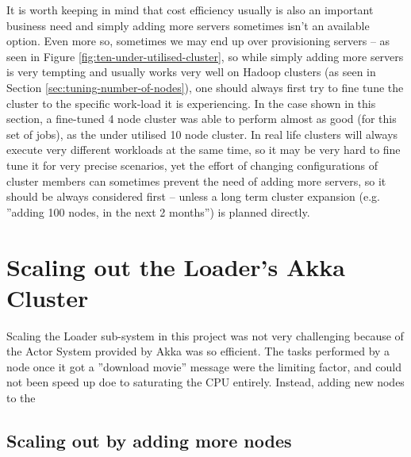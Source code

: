 It is worth keeping in mind that cost efficiency usually is also an important business need and simply adding more servers sometimes isn't an available option. Even more so, sometimes we may end up over provisioning servers -- as seen in Figure \ref{fig:ten-under-utilised-cluster}, so while simply adding more servers is very tempting and usually works very well on Hadoop clusters (as seen in Section \ref{sec:tuning-number-of-nodes}), one should always first try to fine tune the cluster to the specific work-load it is experiencing. In the case shown in this section, a fine-tuned 4 node cluster was able to perform almost as good (for this set of jobs), as the under utilised 10 node cluster. In real life clusters will always execute very different workloads at the same time, so it may be very hard to fine tune it for very precise scenarios, yet the effort of changing configurations of cluster members can sometimes prevent the need of adding more servers, so it should be always considered first -- unless a long term cluster expansion (e.g. ''adding 100 nodes, in the next 2 months'') is planned directly.

%



\section{Scaling out the Loader's Akka Cluster}
\label{sec:scaling-akka}

Scaling the Loader sub-system in this project was not very challenging because of the Actor System provided by Akka was so efficient. The tasks performed by a node once it got a ''download movie'' message were the limiting factor, and could not been speed up doe to saturating the CPU entirely. Instead, adding new nodes to the 

\subsection{Scaling out by adding more nodes}
\label{sec:scaling-akka-out}

